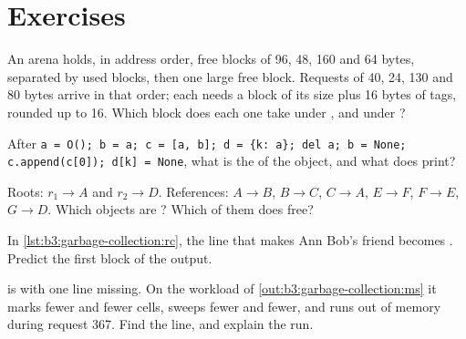 \section{Exercises}\label{sec:b3:garbage-collection:exercises}

\begin{exercise}[$\star$]\label{exo:b3:garbage-collection:1}
An arena holds, in address order, free blocks of 96, 48, 160 and 64 bytes, separated by used blocks, then one large free block. Requests of 40, 24, 130 and 80 bytes arrive in that order; each needs a block of its size plus 16 bytes of tags, rounded up to 16. Which block does each one take under , and under ?
\end{exercise}

\begin{exercise}[$\star$]\label{exo:b3:garbage-collection:2}
After \texttt{a = O(); b = a; c = [a, b]; d = \{\textquotesingle{}k\textquotesingle{}:\ a\}; del a; b = None; c.append(c[0]); d[\textquotesingle{}k\textquotesingle{}] = None}, what is the  of the object, and what does  print?
\end{exercise}

\begin{exercise}[$\star$]\label{exo:b3:garbage-collection:3}
Roots: $r_1 \to A$ and $r_2 \to D$. References: $A \to B$, $B \to C$, $C \to A$, $E \to F$, $F \to E$, $G \to D$. Which objects are ? Which of them does  free?
\end{exercise}

\begin{exercise}[$\star$]\label{exo:b3:garbage-collection:4}
In \cref{lst:b3:garbage-collection:rc}, the line that makes Ann Bob's friend becomes . Predict the first block of the output.
\end{exercise}

\begin{exercise}[$\star\star$]\label{exo:b3:garbage-collection:5}
 is  with one line missing. On the workload of \cref{out:b3:garbage-collection:ms} it marks fewer and fewer cells, sweeps fewer and fewer, and runs out of memory during request 367. Find the line, and explain the run.
\end{exercise}

